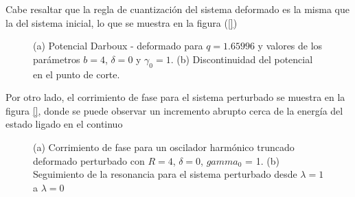 Cabe resaltar que la regla de cuantización del sistema deformado es la misma que la del sistema inicial, lo que se muestra en la figura (\ref{})

\begin{figure}
	\centering
	\hfill%
	\caption{{\label{Figure vNWPot}} (a) Potencial Darboux - deformado para $q=1.65996$ y valores de los parámetros  $b=4$, $\delta=0$ y $\gamma_0=1$. (b) Discontinuidad del potencial en el punto de corte.}
\end{figure}

Por otro lado, el corrimiento de fase para el sistema perturbado se muestra en la figura \ref{}, donde se puede observar un incremento abrupto cerca de la energía del estado ligado en el continuo
\begin{figure}
	\centering
	\hfill%
	\caption{{\label{Figure OHTD_BIC}} (a) Corrimiento de fase para un oscilador harmónico truncado deformado perturbado con $R = 4$, $\delta = 0$, $gamma_0$ = 1. (b) Seguimiento de la resonancia para el sistema perturbado desde $\lambda = 1$ a $\lambda = 0$}
\end{figure}

